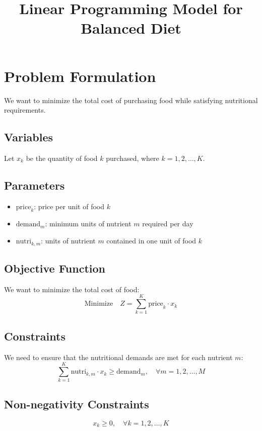 \documentclass{article}
\begin{document}
\title{Linear Programming Model for Balanced Diet}
\author{}
\date{}
\maketitle

\section*{Problem Formulation}

We want to minimize the total cost of purchasing food while satisfying nutritional requirements.

\subsection*{Variables}
Let \( x_k \) be the quantity of food \( k \) purchased, where \( k = 1, 2, \ldots, K \).

\subsection*{Parameters}
\begin{itemize}
    \item \( \text{price}_k \): price per unit of food \( k \)
    \item \( \text{demand}_m \): minimum units of nutrient \( m \) required per day
    \item \( \text{nutri}_{k,m} \): units of nutrient \( m \) contained in one unit of food \( k \)
\end{itemize}

\subsection*{Objective Function}
We want to minimize the total cost of food:
\[
\text{Minimize} \quad Z = \sum_{k=1}^{K} \text{price}_k \cdot x_k
\]

\subsection*{Constraints}
We need to ensure that the nutritional demands are met for each nutrient \( m \):
\[
\sum_{k=1}^{K} \text{nutri}_{k,m} \cdot x_k \geq \text{demand}_m, \quad \forall m = 1, 2, \ldots, M
\]

\subsection*{Non-negativity Constraints}
\[
x_k \geq 0, \quad \forall k = 1, 2, \ldots, K
\]
\end{document}
